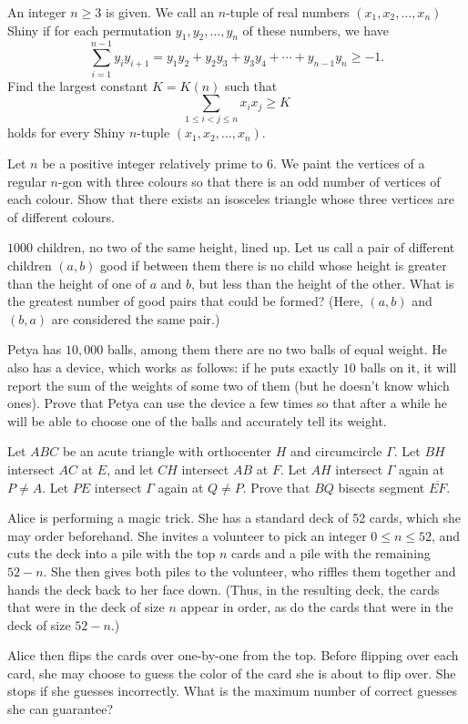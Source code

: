 \documentclass[11pt]{scrartcl}
\begin{document}
\begin{problem}[3442101705279585713]
An integer $n \geq 3$ is given. We call an $n$-tuple of real numbers $(x_1, x_2, \dots, x_n)$ Shiny if for each permutation $y_1, y_2, \dots, y_n$ of these numbers, we have
$$\sum \limits_{i=1}^{n-1} y_i y_{i+1} = y_1y_2 + y_2y_3 + y_3y_4 + \cdots + y_{n-1}y_n \geq -1.$$Find the largest constant $K = K(n)$ such that
$$\sum \limits_{1 \leq i < j \leq n} x_i x_j \geq K$$holds for every Shiny $n$-tuple $(x_1, x_2, \dots, x_n)$.
\end{problem}
\begin{problem}[816006272568007]
	Let $n$ be a positive integer relatively prime to $6$. We paint the vertices of a regular $n$-gon with three colours so that there is an odd number of vertices of each colour. Show that there exists an isosceles triangle whose three vertices are of different colours.
\end{problem}
\begin{problem}[181878217485192]
$1000$ children, no two of the same height, lined up. Let us call a pair of different children $(a,b)$ good if between them there is no child whose height is greater than the height of one of $a$ and $b$, but less than the height of the other. What is the greatest number of good pairs that could be formed? (Here, $(a,b)$ and $(b,a)$ are considered the same pair.)
\end{problem}
\begin{problem}[561375932085594939]
Petya has $10, 000$ balls, among them there are no two balls of equal weight. He also has a device, which works as follows: if he puts exactly $10$ balls on it, it will report the sum of the weights of some two of them (but he doesn't know which ones). Prove that Petya can use the device a few times so that after a while he will be able to choose one of the balls and accurately tell its weight.
\end{problem}
\begin{problem}[8528437132500966626]
	Let $ABC$ be an acute triangle with orthocenter $H$ and circumcircle $\Gamma$. Let $BH$ intersect $AC$ at $E$, and let $CH$ intersect $AB$ at $F$. Let $AH$ intersect $\Gamma$ again at $P \neq A$. Let $PE$ intersect $\Gamma$ again at $Q \neq P$. Prove that $BQ$ bisects segment $\overline{EF}$.
\end{problem}
\begin{problem}[958328158026487]
Alice is performing a magic trick. She has a standard deck of 52 cards, which she may order beforehand. She invites a volunteer to pick an integer \(0\le n\le 52\), and cuts the deck into a pile with the top \(n\) cards and a pile with the remaining \(52-n\). She then gives both piles to the volunteer, who riffles them together and hands the deck back to her face down. (Thus, in the resulting deck, the cards that were in the deck of size \(n\) appear in order, as do the cards that were in the deck of size \(52-n\).)

Alice then flips the cards over one-by-one from the top. Before flipping over each card, she may choose to guess the color of the card she is about to flip over. She stops if she guesses incorrectly. What is the maximum number of correct guesses she can guarantee?
\end{problem}
\end{document}
